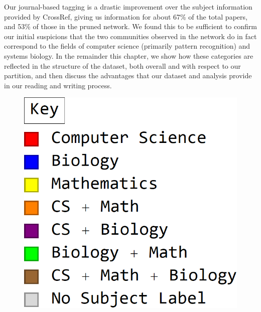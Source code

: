 \documentclass[12pt]{thesis}
\theoremstyle{plain}
\theoremstyle{definition}
\theoremstyle{remark}
\begin{document}
Our journal-based tagging is a drastic improvement over the subject information provided by CrossRef, giving us information for about 67\% of the total papers, and 53\% of those in the pruned network. We found this to be sufficient to confirm our initial suspicions that the two communities observed in the network do in fact correspond to the fields of computer science (primarily pattern recognition) and systems biology. In the remainder this chapter, we show how these categories are reflected in the structure of the dataset, both overall and with respect to our partition, and then discuss the advantages that our dataset and analysis provide in our reading and writing process.

\begin{figure}[p]
\centering
\begin{minipage}[c]{0.23\textwidth}
\includegraphics[width=\textwidth]{color_key.png}
\end{minipage}
\hfill
\begin{minipage}[c]{0.7\textwidth}

\end{minipage}
\end{figure}
\end{document}
